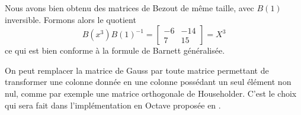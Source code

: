 \documentclass{standalone}
\begin{document}
Nous avons bien obtenu des matrices de Bezout de même taille, avec $B(1)$ inversible. Formons alors le quotient
\begin{equation}
	B(x^3)B(1)^{-1} =
	\begin{bmatrix}
		-6 & -14 \\
		7 & 15
	\end{bmatrix}
	= X^3
\end{equation}
ce qui est bien conforme à la formule de Barnett généralisée.

\begin{rem}
On peut remplacer la matrice de Gauss par toute matrice permettant de transformer une colonne donnée en une colonne possédant un seul élément non nul, comme par exemple une matrice orthogonale de Householder. C'est le choix qui sera fait dans l'implémentation en Octave proposée en \cite{jp_code}.

\end{rem}
\end{document}
